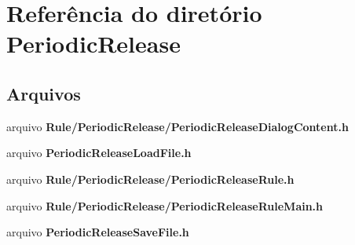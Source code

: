 \section{Referência do diretório Periodic\+Release}
\label{dir_a985204863feb4b9391d20419ea76eec}
\subsection*{Arquivos}
\begin{DoxyCompactItemize}
\item 
arquivo {\bf Rule/\+Periodic\+Release/\+Periodic\+Release\+Dialog\+Content.\+h}
\item 
arquivo {\bf Periodic\+Release\+Load\+File.\+h}
\item 
arquivo {\bf Rule/\+Periodic\+Release/\+Periodic\+Release\+Rule.\+h}
\item 
arquivo {\bf Rule/\+Periodic\+Release/\+Periodic\+Release\+Rule\+Main.\+h}
\item 
arquivo {\bf Periodic\+Release\+Save\+File.\+h}
\end{DoxyCompactItemize}
